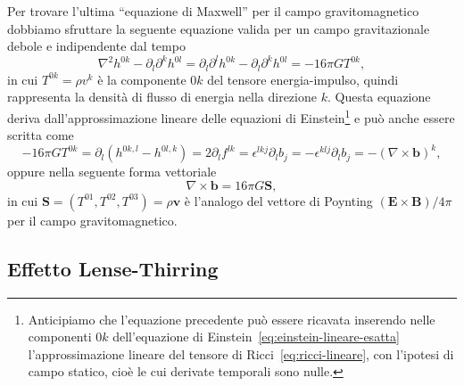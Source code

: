 Per trovare l'ultima ``equazione di Maxwell'' per il campo gravitomagnetico
dobbiamo sfruttare la seguente equazione valida per un campo gravitazionale
debole e indipendente dal tempo
\begin{equation}
  \nabla^{2}h^{0k} - \partial_{l}\partial^{k} h^{0l} = \partial_{l}\partial^{l}
  h^{0k} - \partial_{l}\partial^{k} h^{0l} = -16\pi GT^{0k},
\end{equation}
in cui $T^{0k} = \rho v^{k}$ è la componente $0k$ del tensore energia-impulso,
quindi rappresenta la densità di flusso di energia nella direzione $k$.  Questa
equazione deriva dall'approssimazione lineare delle equazioni di
Einstein\footnote{Anticipiamo che l'equazione precedente può essere ricavata
  inserendo nelle componenti $0k$ dell'equazione di
  Einstein~\eqref{eq:einstein-lineare-esatta} l'approssimazione lineare del
  tensore di Ricci~\eqref{eq:ricci-lineare}, con l'ipotesi di campo statico,
  cioè le cui derivate temporali sono nulle.}  e può anche essere scritta come
\begin{equation}
  -16\pi GT^{0k} = \partial_{l}(h^{0k,l} - h^{0l,k}) = 2\partial_{l}f^{lk} =
  \epsilon^{lkj}\partial_{l}b_{j} = -\epsilon^{klj}\partial_{l}b_{j} = -(\nabla
  \times \bm{b})^{k},
\end{equation}
oppure nella seguente forma vettoriale
\begin{equation}
  \nabla \times \bm{b} = 16\pi G \bm{S},
\end{equation}
in cui $\bm{S} = (T^{01}, T^{02}, T^{03}) = \rho \bm{v}$ è l'analogo del
vettore di Poynting $(\bm{E}\times\bm{B})/4\pi$ per
il campo gravitomagnetico.

\subsection{Effetto Lense-Thirring}
\label{sec:effetto-lense-thirring}

